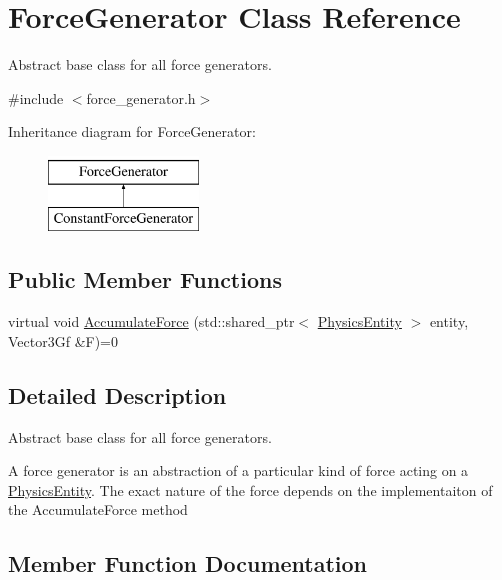 \hypertarget{classForceGenerator}{}\section{Force\+Generator Class Reference}
\label{classForceGenerator}


Abstract base class for all force generators.  




{\ttfamily \#include $<$force\+\_\+generator.\+h$>$}

Inheritance diagram for Force\+Generator\+:\begin{figure}[H]
\begin{center}
\leavevmode
\includegraphics[height=2.000000cm]{classForceGenerator}
\end{center}
\end{figure}
\subsection*{Public Member Functions}
\begin{DoxyCompactItemize}
\item 
virtual void \hyperlink{classForceGenerator_a96cae0febb1fa8a0bb017aba7b82dbe8}{Accumulate\+Force} (std\+::shared\+\_\+ptr$<$ \hyperlink{classPhysicsEntity}{Physics\+Entity} $>$ entity, Vector3\+Gf \&F)=0
\end{DoxyCompactItemize}


\subsection{Detailed Description}
Abstract base class for all force generators. 

A force generator is an abstraction of a particular kind of force acting on a \hyperlink{classPhysicsEntity}{Physics\+Entity}. The exact nature of the force depends on the implementaiton of the Accumulate\+Force method 

\subsection{Member Function Documentation}
\mbox{\label{classForceGenerator_a96cae0febb1fa8a0bb017aba7b82dbe8}} 
